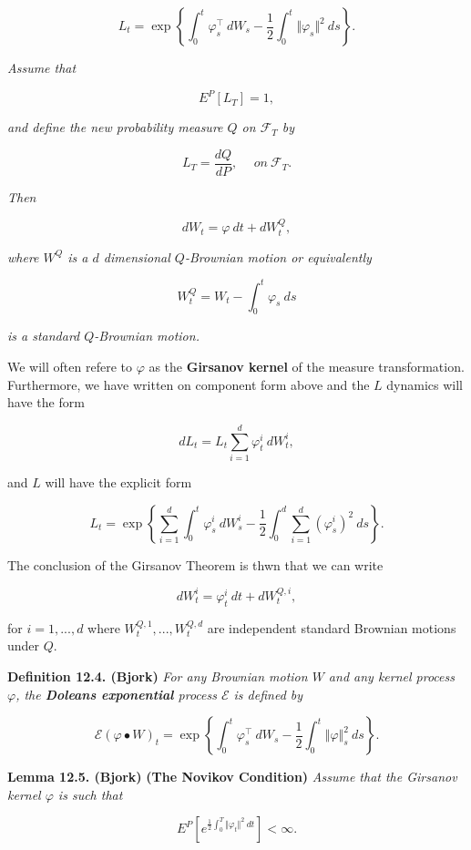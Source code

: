\documentclass[a4paper,12pt,openany]{book}
\begin{document}
\[
L_t = \exp\left\{\int_0^t \varphi^\top_s\ dW_s - \frac{1}{2}\int_0^t \Vert\varphi_s\Vert ^2\ ds\right\}.
\]

\emph{Assume that}

\[
E^P[L_T]=1,\tag{12.18}
\]

\emph{and define the new probability measure \(Q\) on \(\mathcal{F}_T\) by}

\[
L_T=\frac{dQ}{dP},\hspace{15pt}on\ \mathcal{F}_T.\tag{12.19}
\]

\emph{Then}

\[
dW_t=\varphi\ dt+dW_t^Q,\tag{12.20}
\]

\emph{where \(W^Q\) is a \(d\) dimensional \(Q\)-Brownian motion or equivalently}

\[
W_t^Q=W_t-\int_0^t\varphi_s\ ds\tag{12.21}
\]

\emph{is a standard \(Q\)-Brownian motion.}

We will often refere to \(\varphi\) as the \textbf{Girsanov kernel} of the measure transformation. Furthermore, we have written on component form above and the \(L\) dynamics will have the form

\[
dL_t=L_t\sum_{i=1}^d\varphi^i_t\ dW_t^i,
\]

and \(L\) will have the explicit form

\[
L_t=\exp\left\{\sum_{i=1}^d\int_0^t\varphi^i_s\ dW_s^i - \frac{1}{2}\int_0^d\sum_{i=1}^d(\varphi^i_s)^2\ ds\right\}.
\]

The conclusion of the Girsanov Theorem is thwn that we can write

\[
dW_t^i=\varphi_t^i\ dt+dW_t^{Q,i},
\]

for \(i=1,...,d\) where \(W_t^{Q,1},...,W_t^{Q,d}\) are independent standard Brownian motions under \(Q\).

\textbf{Definition 12.4. (Bjork)} \emph{For any Brownian motion \(W\) and any kernel process \(\varphi\), the \textbf{Doleans exponential} process \(\mathcal{E}\) is defined by}

\[
\mathcal{E}(\varphi\bullet W)_t=\exp\left\{\int_0^t\varphi^\top_s\ dW_s -\frac{1}{2}\int_0^t\Vert \varphi\Vert^2_s\ ds\right\}.\tag{12.24}
\]

\textbf{Lemma 12.5. (Bjork)} \textbf{(The Novikov Condition)} \emph{Assume that the Girsanov kernel \(\varphi\) is such that}

\[
E^P\left[e^{\frac{1}{2}\int_0^T\Vert \varphi_t\Vert^2\ dt}\right]<\infty.\tag{12.27}
\]
\end{document}
